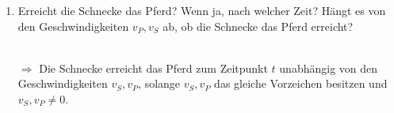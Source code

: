 \documentclass{HM}
\begin{document}
\begin{enumerate}
\begin{enumerate}
			\item Erreicht die Schnecke das Pferd? Wenn ja, nach welcher Zeit? Hängt es von den Geschwindigkeiten $v_P, v_S$ ab, ob die Schnecke das Pferd erreicht?
			\begin{eqnn}
			\end{eqnn}\\
			$\Rightarrow$ Die Schnecke erreicht das Pferd zum Zeitpunkt $t$ unabhängig von den Geschwindigkeiten $v_S, v_P$, solange $v_S, v_P$ das gleiche Vorzeichen besitzen und $v_S, v_P \not= 0$.
		\end{enumerate}
	\end{enumerate}
\end{document}
